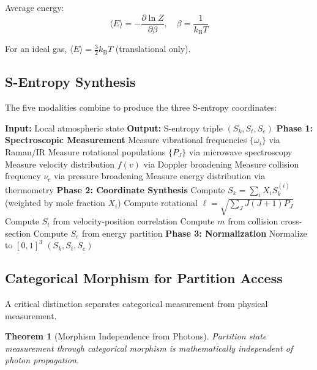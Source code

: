 \documentclass[twocolumn,10pt,a4paper]{article}
\newtheorem{theorem}{Theorem}[section]
\theoremstyle{definition}
\theoremstyle{remark}
\newcommand{\kB}{k_{\mathrm{B}}}
\begin{document}
Average energy:
\begin{equation}
    \langle E \rangle = -\frac{\partial \ln Z}{\partial \beta}, \quad \beta = \frac{1}{\kB T}
\end{equation}

For an ideal gas, $\langle E \rangle = \frac{3}{2}\kB T$ (translational only).

\subsection{S-Entropy Synthesis}

The five modalities combine to produce the three S-entropy coordinates:

\begin{algorithm}[H]
\caption{Atmospheric S-Entropy Measurement}
\label{alg:s_entropy}
\begin{algorithmic}[1]
\STATE \textbf{Input:} Local atmospheric state
\STATE \textbf{Output:} S-entropy triple $(S_k, S_t, S_e)$
\STATE
\STATE \textbf{Phase 1: Spectroscopic Measurement}
\STATE Measure vibrational frequencies $\{\omega_i\}$ via Raman/IR
\STATE Measure rotational populations $\{P_J\}$ via microwave spectroscopy
\STATE Measure velocity distribution $f(v)$ via Doppler broadening
\STATE Measure collision frequency $\nu_c$ via pressure broadening
\STATE Measure energy distribution via thermometry
\STATE
\STATE \textbf{Phase 2: Coordinate Synthesis}
\STATE Compute $S_k = \sum_i X_i S_k^{(i)}$ (weighted by mole fraction $X_i$)
\STATE Compute rotational $\ell = \sqrt{\sum_J J(J+1) P_J}$
\STATE Compute $S_t$ from velocity-position correlation
\STATE Compute $m$ from collision cross-section
\STATE Compute $S_e$ from energy partition
\STATE
\STATE \textbf{Phase 3: Normalization}
\STATE Normalize to $[0, 1]^3$
\RETURN $(S_k, S_t, S_e)$
\end{algorithmic}
\end{algorithm}

\subsection{Categorical Morphism for Partition Access}

A critical distinction separates categorical measurement from physical measurement.

\begin{theorem}[Morphism Independence from Photons]
\label{thm:morphism}
Partition state measurement through categorical morphism is mathematically independent of photon propagation.
\end{theorem}
\end{document}
